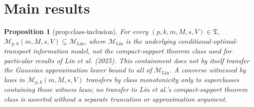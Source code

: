 \documentclass{article}
\newtheorem{proposition}{Proposition}
\begin{document}
\section{Main results}

\begin{proposition}[prop:class-inclusion]\label{prop:class-inclusion}
For every \((p,k,m,M,s,V)\in\mathfrak T\), \(\mathcal M_{p,k}(m,M,s,V)\subsetneq\mathcal M_{\mathrm{Lin}}\), where \(\mathcal M_{\mathrm{Lin}}\) is the underlying conditional-optimal-transport information model, not the compact-support theorem class used for particular results of Lin et al. (2025). This containment does not by itself transfer the Gaussian approximation lower bound to all of \(\mathcal M_{\mathrm{Lin}}\). A converse witnessed by laws in \(\mathcal M_{p,k}(m,M,s,V)\) transfers by class monotonicity only to superclasses containing those witness laws; no transfer to Lin et al.'s compact-support theorem class is asserted without a separate truncation or approximation argument.
\end{proposition}
\end{document}
